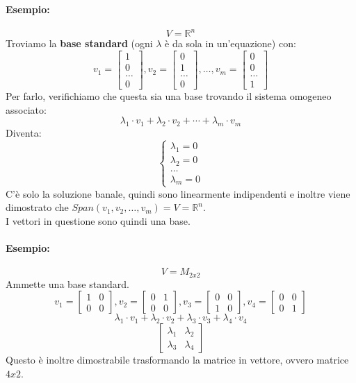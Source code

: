 \documentclass[12pt,a4paper]{article}
\begin{document}
\paragraph{Esempio:}
\[
V = \mathbb{R}^n
\]
Troviamo la \textbf{base standard} (ogni $\lambda$ è da sola in un'equazione) con:
\[
v_1 = \begin{bmatrix}
  1\\
  0\\
  \ldots\\
  0
\end{bmatrix}, v_2 = \begin{bmatrix}
  0\\
  1\\
  \ldots\\
  0
\end{bmatrix},\ldots, v_m = \begin{bmatrix}
  0\\
  0\\
  \ldots\\
  1
\end{bmatrix}
\]
Per farlo, verifichiamo che questa sia una base trovando il sistema omogeneo associato:
\[
\lambda_1 \cdot v_1 + \lambda_2 \cdot v_2 + \cdots + \lambda_m \cdot v_m
\]
Diventa:
\[
\begin{cases}
  \lambda_1 = 0\\
  \lambda_2 = 0\\
  \ldots\\
  \lambda_m = 0
\end{cases}
\]
C'è solo la soluzione banale, quindi sono linearmente indipendenti e inoltre viene dimostrato che $Span(v_1,v_2,\ldots,v_m) = V = \mathbb{R}^n$.\\
I vettori in questione sono quindi una base.
\paragraph{Esempio:}
\[
V = M_{2x2}
\]
Ammette una base standard.\\
\[
v_1 = \begin{bmatrix}
  1 & 0\\
  0 & 0
\end{bmatrix}, v_2 = \begin{bmatrix}
  0 & 1\\
  0 & 0
\end{bmatrix}, v_3 = \begin{bmatrix}
  0 & 0\\
  1 & 0
\end{bmatrix}, v_4 = \begin{bmatrix}
  0 & 0\\
  0 & 1
\end{bmatrix}
\]
\[
\lambda_1 \cdot v_1 + \lambda_2 \cdot v_2 + \lambda_3 \cdot v_3 + \lambda_4 \cdot v_4
\]
\[
\begin{bmatrix}
  \lambda_1 & \lambda_2\\
  \lambda_3 & \lambda_4
\end{bmatrix}
\]
Questo è inoltre dimostrabile trasformando la matrice in vettore, ovvero matrice $4x2$.
\end{document}
